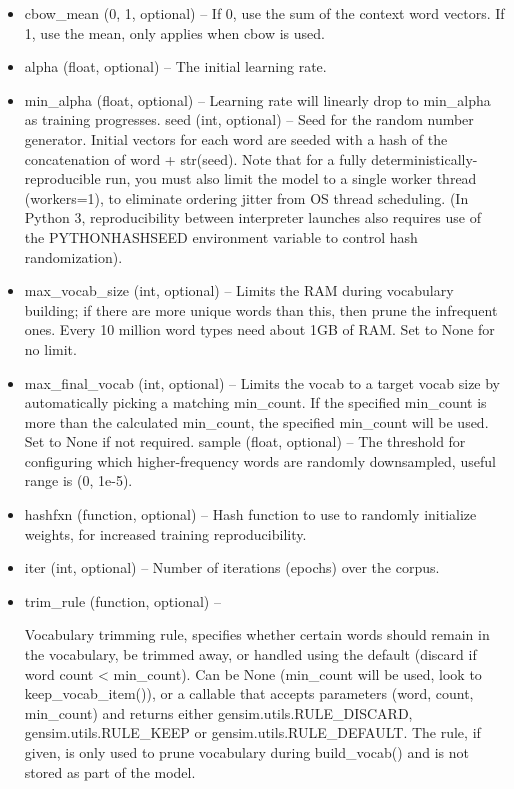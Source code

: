 \begin{itemize}
   \item cbow\_mean ({0, 1}, optional) – If 0, use the sum of the context word vectors. If 1, use the mean, only applies when cbow is used.
\item    alpha (float, optional) – The initial learning rate.
 \item   min\_alpha (float, optional) – Learning rate will linearly drop to min\_alpha as training progresses.
    seed (int, optional) – Seed for the random number generator. Initial vectors for each word are seeded with a hash of the concatenation of word + str(seed). Note that for a fully deterministically-reproducible run, you must also limit the model to a single worker thread (workers=1), to eliminate ordering jitter from OS thread scheduling. (In Python 3, reproducibility between interpreter launches also requires use of the PYTHONHASHSEED environment variable to control hash randomization).
\item    max\_vocab\_size (int, optional) – Limits the RAM during vocabulary building; if there are more unique words than this, then prune the infrequent ones. Every 10 million word types need about 1GB of RAM. Set to None for no limit.
\item    max\_final\_vocab (int, optional) – Limits the vocab to a target vocab size by automatically picking a matching min\_count. If the specified min\_count is more than the calculated min\_count, the specified min\_count will be used. Set to None if not required.
    sample (float, optional) – The threshold for configuring which higher-frequency words are randomly downsampled, useful range is (0, 1e-5).
   \item hashfxn (function, optional) – Hash function to use to randomly initialize weights, for increased training reproducibility.
  \item  iter (int, optional) – Number of iterations (epochs) over the corpus.
 \item   trim\_rule (function, optional) –

    Vocabulary trimming rule, specifies whether certain words should remain in the vocabulary, be trimmed away, or handled using the default (discard if word count < min\_count). Can be None (min\_count will be used, look to keep\_vocab\_item()), or a callable that accepts parameters (word, count, min\_count) and returns either gensim.utils.RULE\_DISCARD, gensim.utils.RULE\_KEEP or gensim.utils.RULE\_DEFAULT. The rule, if given, is only used to prune vocabulary during build\_vocab() and is not stored as part of the model.


\end{itemize}
